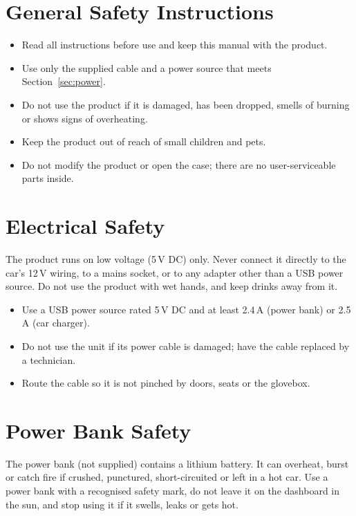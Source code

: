 \documentclass[11pt,a4paper,oneside]{report}
\begin{document}
\section{General Safety Instructions}
\begin{itemize}[leftmargin=*]
\item Read all instructions before use and keep this manual with the product.
\item Use only the supplied cable and a power source that meets Section~\ref{sec:power}.
\item Do not use the product if it is damaged, has been dropped, smells of burning or shows signs of overheating.
\item Keep the product out of reach of small children and pets.
\item Do not modify the product or open the case; there are no user-serviceable parts inside.
\end{itemize}

\section{Electrical Safety}
\begin{caution}
The product runs on low voltage (5\,V DC) only. Never connect it directly to the car's 12\,V wiring, to a mains socket, or to any adapter other than a USB power source. Do not use the product with wet hands, and keep drinks away from it.
\end{caution}
\begin{itemize}[leftmargin=*]
\item Use a USB power source rated 5\,V DC and at least 2.4\,A (power bank) or 2.5\,A (car charger).
\item Do not use the unit if its power cable is damaged; have the cable replaced by a technician.
\item Route the cable so it is not pinched by doors, seats or the glovebox.
\end{itemize}

\section{Power Bank Safety}
\begin{warning}
The power bank (not supplied) contains a lithium battery. It can overheat, burst or catch fire if crushed, punctured, short-circuited or left in a hot car. Use a power bank with a recognised safety mark, do not leave it on the dashboard in the sun, and stop using it if it swells, leaks or gets hot.
\end{warning}
\end{document}

